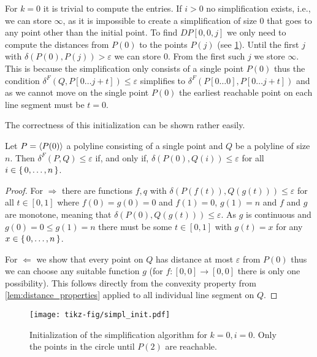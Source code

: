 For \(k = 0\) it is trivial to compute the entries. If \(i > 0\) no simplification exists, i.e., we can store \(\infty\), as it is impossible to create a simplification of size \(0\) that goes to any point other than the initial point. To find \(DP[0, 0, j]\) we only need to compute the distances from \(P(0)\) to the points \(P(j)\) (see \cref{fig:simpl_init}). Until the first \(j\) with \(\delta(P(0), P(j)) > \varepsilon\) we can store \(0\). From the first such \(j\) we store \(\infty\). This is because the simplification only consists of a single point \(P(0)\) thus the condition \(\delta^F(Q, P[0\dots j + t]) \leq \varepsilon\) simplifies to \(\delta^F(P[0 \dots 0], P[0 \dots j + t])\) and as we cannot move on the single point \(P(0)\) the earliest reachable point on each line segment must be \(t = 0\). 

The correctness of this initialization can be shown rather easily. 
\begin{lemma}
  Let \(P = \left\langle P(0)\right\rangle\) a polyline consisting of a single point and \(Q\) be a polyline of size \(n\). Then \(\delta^F(P, Q) \leq \varepsilon\) if, and only if, \(\delta(P(0), Q(i)) \leq \varepsilon\) for all \(i \in \set{0, \dots, n}\). 
\end{lemma}
\begin{proof}
  For \(\Rightarrow\) there are functions \(f,q\) with \(\delta(P(f(t)), Q(g(t))) \leq \varepsilon\) for all \(t\in [0,1]\) where \(f(0) = g(0) = 0\) and \(f(1) = 0\), \(g(1) = n\) and \(f\) and \(g\) are  monotone, meaning that \(\delta(P(0), Q(g(t))) \leq \varepsilon\). As \(g\) is continuous and \(g(0) = 0 \leq g(1) = n\) there must be some \(t \in [0,1]\) with \(g(t) = x\) for any \(x\in \set{0, \dots, n}\).
  
  For \(\Leftarrow\) we show that every point on \(Q\) has distance at most \(\varepsilon\) from \(P(0)\) thus we can choose any suitable function \(g\) (for \(f:[0,0] \to [0,0]\) there is only one possibility). This follows directly from the convexity property from \cref{lem:distance_properties} applied to all individual line segment on \(Q\).
\end{proof}

\begin{figure}[b]
  \centering
  \texttt{[image: tikz-fig/simpl\_init.pdf]}
  \caption{Initialization of the simplification algorithm for \(k = 0, i = 0\). Only the points in the circle until \(P(2)\) are reachable.}
  \label{fig:simpl_init}
\end{figure}


